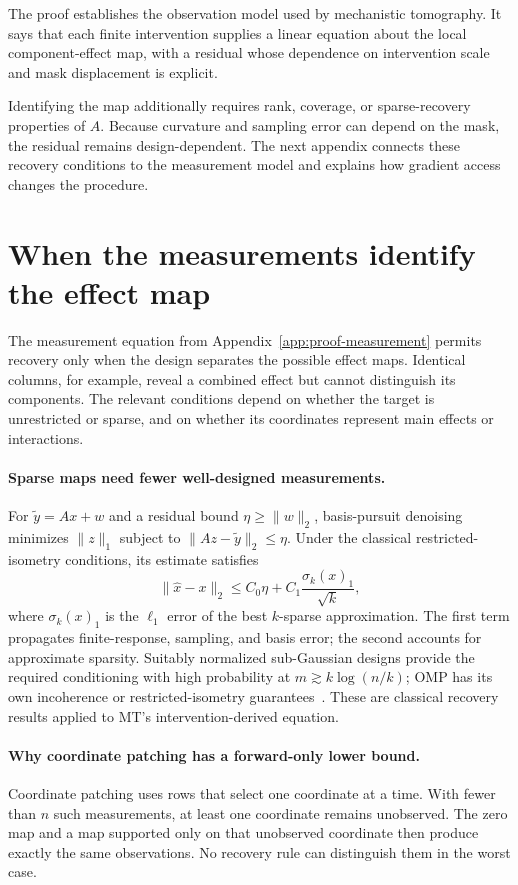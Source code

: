 \documentclass[sigconf,10pt,nonacm,balance=false]{acmart}
\begin{document}
The proof establishes the observation model used by mechanistic tomography. It says that each finite intervention supplies a linear equation about the local component-effect map, with a residual whose dependence on intervention scale and mask displacement is explicit.

Identifying the map additionally requires rank, coverage, or sparse-recovery properties of $A$. Because curvature and sampling error can depend on the mask, the residual remains design-dependent. The next appendix connects these recovery conditions to the measurement model and explains how gradient access changes the procedure.

\section{When the measurements identify the effect map}\label{app:proof-lifted}

The measurement equation from Appendix~\ref{app:proof-measurement} permits recovery only when the design separates the possible effect maps. Identical columns, for example, reveal a combined effect but cannot distinguish its components. The relevant conditions depend on whether the target is unrestricted or sparse, and on whether its coordinates represent main effects or interactions.

\paragraph{Sparse maps need fewer well-designed measurements.}
For $\widetilde y=Ax+w$ and a residual bound $\eta\ge\|w\|_2$, basis-pursuit denoising minimizes $\|z\|_1$ subject to $\|Az-\widetilde y\|_2\le\eta$. Under the classical restricted-isometry conditions, its estimate satisfies~\cite{candes2006robust}
\begin{equation}
    \|\widehat x-x\|_2 \le C_0\eta + C_1\frac{\sigma_k(x)_1}{\sqrt{k}},
\end{equation}
where $\sigma_k(x)_1$ is the $\ell_1$ error of the best $k$-sparse approximation. The first term propagates finite-response, sampling, and basis error; the second accounts for approximate sparsity. Suitably normalized sub-Gaussian designs provide the required conditioning with high probability at $m\gtrsim k\log(n/k)$; OMP has its own incoherence or restricted-isometry guarantees~\cite{tropp2007omp}. These are classical recovery results applied to MT's intervention-derived equation.

\paragraph{Why coordinate patching has a forward-only lower bound.}
Coordinate patching uses rows that select one coordinate at a time. With fewer than $n$ such measurements, at least one coordinate remains unobserved. The zero map and a map supported only on that unobserved coordinate then produce exactly the same observations. No recovery rule can distinguish them in the worst case.
\end{document}
